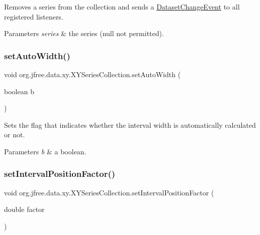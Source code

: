 Removes a series from the collection and sends a \mbox{\hyperlink{}{Dataset\+Change\+Event}} to all registered listeners.


\begin{DoxyParams}{Parameters}
{\em series} & the series ({\ttfamily null} not permitted). \\
\hline
\end{DoxyParams}
\mbox{\label{classorg_1_1jfree_1_1data_1_1xy_1_1_x_y_series_collection_a55c279bc4359cce14eb093536141af0d}} 
\subsubsection{\texorpdfstring{set\+Auto\+Width()}{setAutoWidth()}}
{\footnotesize\ttfamily void org.\+jfree.\+data.\+xy.\+X\+Y\+Series\+Collection.\+set\+Auto\+Width (\begin{DoxyParamCaption}\item[{boolean}]{b }\end{DoxyParamCaption})}

Sets the flag that indicates whether the interval width is automatically calculated or not.


\begin{DoxyParams}{Parameters}
{\em b} & a boolean. \\
\hline
\end{DoxyParams}
\mbox{\label{classorg_1_1jfree_1_1data_1_1xy_1_1_x_y_series_collection_ae75dd5ff3ef476d50cc53a07cd7c97a6}} 
\subsubsection{\texorpdfstring{set\+Interval\+Position\+Factor()}{setIntervalPositionFactor()}}
{\footnotesize\ttfamily void org.\+jfree.\+data.\+xy.\+X\+Y\+Series\+Collection.\+set\+Interval\+Position\+Factor (\begin{DoxyParamCaption}\item[{double}]{factor }\end{DoxyParamCaption})}

